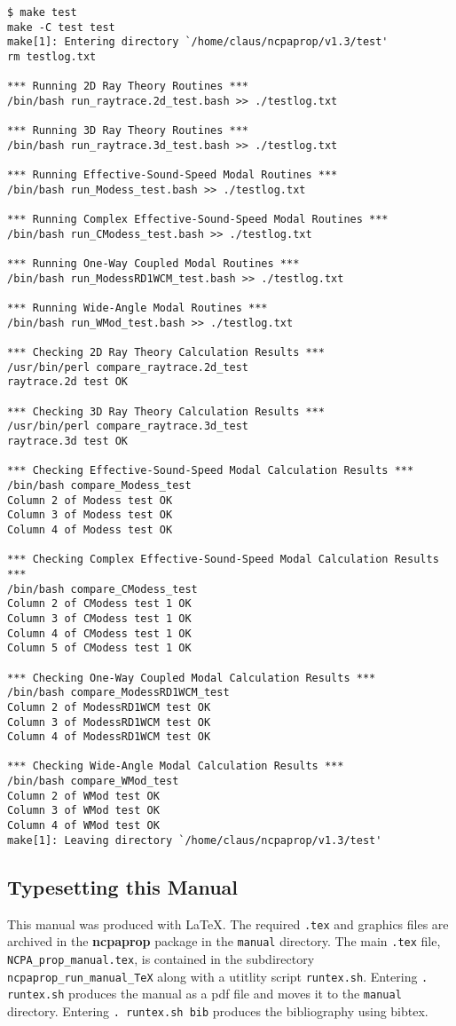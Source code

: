 \begin{verbatim}
$ make test
make -C test test
make[1]: Entering directory `/home/claus/ncpaprop/v1.3/test'
rm testlog.txt

*** Running 2D Ray Theory Routines ***
/bin/bash run_raytrace.2d_test.bash >> ./testlog.txt

*** Running 3D Ray Theory Routines ***
/bin/bash run_raytrace.3d_test.bash >> ./testlog.txt

*** Running Effective-Sound-Speed Modal Routines ***
/bin/bash run_Modess_test.bash >> ./testlog.txt 

*** Running Complex Effective-Sound-Speed Modal Routines ***
/bin/bash run_CModess_test.bash >> ./testlog.txt 

*** Running One-Way Coupled Modal Routines ***
/bin/bash run_ModessRD1WCM_test.bash >> ./testlog.txt 

*** Running Wide-Angle Modal Routines ***
/bin/bash run_WMod_test.bash >> ./testlog.txt 

*** Checking 2D Ray Theory Calculation Results ***
/usr/bin/perl compare_raytrace.2d_test
raytrace.2d test OK

*** Checking 3D Ray Theory Calculation Results ***
/usr/bin/perl compare_raytrace.3d_test
raytrace.3d test OK

*** Checking Effective-Sound-Speed Modal Calculation Results ***
/bin/bash compare_Modess_test
Column 2 of Modess test OK
Column 3 of Modess test OK
Column 4 of Modess test OK

*** Checking Complex Effective-Sound-Speed Modal Calculation Results ***
/bin/bash compare_CModess_test
Column 2 of CModess test 1 OK
Column 3 of CModess test 1 OK
Column 4 of CModess test 1 OK
Column 5 of CModess test 1 OK

*** Checking One-Way Coupled Modal Calculation Results ***
/bin/bash compare_ModessRD1WCM_test
Column 2 of ModessRD1WCM test OK
Column 3 of ModessRD1WCM test OK
Column 4 of ModessRD1WCM test OK

*** Checking Wide-Angle Modal Calculation Results ***
/bin/bash compare_WMod_test
Column 2 of WMod test OK
Column 3 of WMod test OK
Column 4 of WMod test OK
make[1]: Leaving directory `/home/claus/ncpaprop/v1.3/test'
\end{verbatim}

\subsection{Typesetting this Manual}

This manual was produced with LaTeX. The required \verb+.tex+ and graphics files are archived in the \textbf{ncpaprop} package in the \verb+manual+ directory. The main \verb+.tex+ file, \verb+NCPA_prop_manual.tex+, is contained in the subdirectory \verb+ncpaprop_run_manual_TeX+ along with a utitlity script \verb+runtex.sh+. Entering \verb+. runtex.sh+ produces the manual as a pdf file and moves it to the \verb+manual+ directory. Entering \verb+. runtex.sh bib+ produces the bibliography using bibtex. 